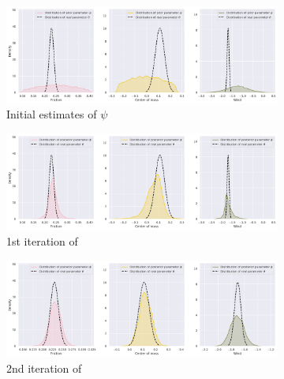 \label{appendix:a}

\begin{figure}
\centering
{}
\captionsetup{size=footnotesize}
\begin{subfigure}{\linewidth}
  \includegraphics[width=1.0\linewidth]{img/windyslope/latent-representation/new/iter0}
  \caption{Initial estimates of $\psi$}
  \label{fig_3_parameters_0}
\end{subfigure}
\begin{subfigure}{\linewidth}
  \includegraphics[width=1.0\linewidth]{img/windyslope/latent-representation/new/latent_encoding_iter1}
  \caption{1st iteration of \dettostoc{}}
  \label{fig_3_parameters_0}
\end{subfigure}
\begin{subfigure}{\textwidth}
  \includegraphics[width=1.0\linewidth]{img/windyslope/latent-representation/new/latent_encoding_iter2}
  \caption{2nd iteration of \dettostoc{}}
\end{subfigure}
\begin{subfigure}{\textwidth}

\end{subfigure}
\end{figure}
